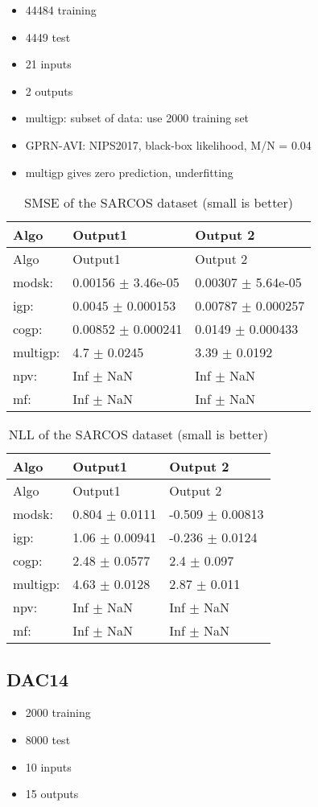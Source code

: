 \begin{itemize}
\item
  44484 training
\item
  4449 test
\item
  21 inputs
\item
  2 outputs
\item
  multigp: subset of data: use 2000 training set
\item
  GPRN-AVI: NIPS2017, black-box likelihood, M/N = 0.04
\item
  multigp gives zero prediction, underfitting
\end{itemize}

\begin{longtable}[]{@{}lll@{}}
\caption{SMSE of the SARCOS dataset (small is better)}\tabularnewline
\toprule
Algo & Output1 & Output 2\tabularnewline
\midrule
\endfirsthead
\toprule
Algo & Output1 & Output 2\tabularnewline
\midrule
\endhead
modsk: & 0.00156 \(\pm\) 3.46e-05 & 0.00307 \(\pm\)
5.64e-05\tabularnewline
igp: & 0.0045 \(\pm\) 0.000153 & 0.00787 \(\pm\) 0.000257\tabularnewline
cogp: & 0.00852 \(\pm\) 0.000241 & 0.0149 \(\pm\)
0.000433\tabularnewline
multigp: & 4.7 \(\pm\) 0.0245 & 3.39 \(\pm\) 0.0192\tabularnewline
npv: & Inf \(\pm\) NaN & Inf \(\pm\) NaN\tabularnewline
mf: & Inf \(\pm\) NaN & Inf \(\pm\) NaN\tabularnewline
\bottomrule
\end{longtable}

\begin{longtable}[]{@{}lll@{}}
\caption{NLL of the SARCOS dataset (small is better)}\tabularnewline
\toprule
Algo & Output1 & Output 2\tabularnewline
\midrule
\endfirsthead
\toprule
Algo & Output1 & Output 2\tabularnewline
\midrule
\endhead
modsk: & 0.804 \(\pm\) 0.0111 & -0.509 \(\pm\) 0.00813\tabularnewline
igp: & 1.06 \(\pm\) 0.00941 & -0.236 \(\pm\) 0.0124\tabularnewline
cogp: & 2.48 \(\pm\) 0.0577 & 2.4 \(\pm\) 0.097\tabularnewline
multigp: & 4.63 \(\pm\) 0.0128 & 2.87 \(\pm\) 0.011\tabularnewline
npv: & Inf \(\pm\) NaN & Inf \(\pm\) NaN\tabularnewline
mf: & Inf \(\pm\) NaN & Inf \(\pm\) NaN\tabularnewline
\bottomrule
\end{longtable}

\subsection{DAC14}\label{sec:dac14}

\begin{itemize}
\item
  2000 training
\item
  8000 test
\item
  10 inputs
\item
  15 outputs
\end{itemize}

